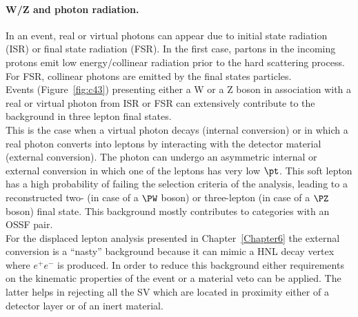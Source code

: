 \paragraph{W/Z and photon radiation.}\label{sec:c4photon}
In an event, real or virtual photons can appear due to initial state
radiation (ISR) or final state radiation (FSR). In the first case,
partons in the incoming protons emit low energy/collinear radiation
prior to the hard scattering process. For FSR, collinear photons are emitted by
the final states particles.\\
Events (Figure~\ref{fig:c43}) presenting either a W or a Z boson in association with a real or virtual
photon from ISR or FSR can extensively contribute to
the background in three lepton final states.\\
This is the case when a virtual photon decays (internal
conversion) or in which a real photon converts into leptons by interacting with the detector material
(external conversion). The photon can undergo an
asymmetric internal or external conversion in which one of the leptons
has very low $\pt$. This soft lepton has a high probability of failing
the selection criteria of the analysis, leading to a reconstructed
two- (in case of a $\PW$ boson) or three-lepton (in case of a $\PZ$
boson) final state. This background mostly contributes to categories
with an OSSF pair.\\
For the displaced lepton analysis presented in Chapter~\ref{Chapter6}
the external conversion is a ``nasty'' background because it can mimic
a HNL decay vertex where $e^{+}e^{-}$ is produced. In order
to reduce this background either requirements on the kinematic
properties of the event or a material veto can be applied. The latter
helps in rejecting all the SV
which are located in proximity either of a detector layer or of an inert material.

